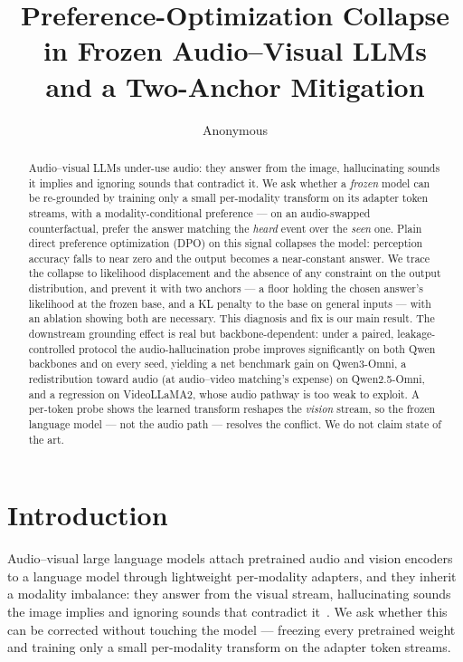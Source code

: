 \documentclass{article}
\title{\textbf{Preference-Optimization Collapse in Frozen Audio--Visual LLMs\\
and a Two-Anchor Mitigation}}
\author{Anonymous}
\date{}
\begin{document}
\maketitle

\begin{abstract}
Audio--visual LLMs under-use audio: they answer from the image, hallucinating sounds it implies and
ignoring sounds that contradict it. We ask whether a \emph{frozen} model can be re-grounded by training
only a small per-modality transform on its adapter token streams, with a modality-conditional preference
--- on an audio-swapped counterfactual, prefer the answer matching the \emph{heard} event over the
\emph{seen} one. Plain direct preference optimization (DPO) on this signal collapses the model: perception
accuracy falls to near zero and the output becomes a near-constant answer. We trace the collapse to
likelihood displacement and the absence of any constraint on the output distribution, and prevent it with
two anchors --- a floor holding the chosen answer's likelihood at the frozen base, and a KL penalty to the
base on general inputs --- with an ablation showing both are necessary. This diagnosis and fix is our main
result. The downstream grounding effect is real but backbone-dependent: under a paired, leakage-controlled
protocol the audio-hallucination probe improves significantly on both Qwen backbones and on every seed,
yielding a net benchmark gain on Qwen3-Omni, a redistribution toward audio (at audio--video matching's
expense) on Qwen2.5-Omni, and a regression on VideoLLaMA2, whose audio pathway is too weak to exploit. A
per-token probe shows the learned transform reshapes the \emph{vision} stream, so the frozen language
model --- not the audio path --- resolves the conflict. We do not claim state of the art.
\end{abstract}

\section{Introduction}
Audio--visual large language models attach pretrained audio and vision encoders to a language model through
lightweight per-modality adapters, and they inherit a modality imbalance: they answer from the visual
stream, hallucinating sounds the image implies and ignoring sounds that contradict it~\cite{cmm,avhbench}.
We ask whether this can be corrected without touching the model --- freezing every pretrained weight and
training only a small per-modality transform on the adapter token streams.
\end{document}

